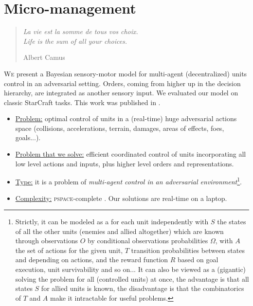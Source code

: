 \chapter{Micro-management}
\begin{quotation}
\noindent
\textit{La vie est la somme de tous vos choix.
\vspace{0.2cm}\\
Life is the sum of all your choices.}
\begin{flushright}Albert Camus\end{flushright}
\end{quotation}

\lettrine{W}{e} present a Bayesian sensory-motor model for multi-agent (decentralized) units control in an adversarial setting. Orders, coming from higher up in the decision hierarchy, are integrated as another sensory input. We evaluated our model on classic StarCraft  tasks. This work was published in \citep{SYNNAEVE:Micro}.

\chaptertoc
{}

\begin{itemize}
\item \underline{Problem:} optimal control of units in a (real-time) huge adversarial actions space (collisions, accelerations, terrain, damages, areas of effects, foes, goals...).
\item \underline{Problem that we solve:} efficient coordinated control of units incorporating all low level actions and inputs, plus higher level orders and representations.
\item \underline{Type:} it is a problem of \textit{multi-agent control in an adversarial environment}\footnote{Strictly, it can be modeled as a  for each unit independently with $S$ the states of all the other units (enemies and allied altogether) which are known through observations $O$ by conditional observations probabilities $\Omega$, with $A$ the set of actions for the given unit, $T$ transition probabilities between states and depending on actions, and the reward function $R$ based on goal execution, unit survivability and so on... It can also be viewed as a (gigantic)  solving the problem for all (controlled units) at once, the advantage is that all states $S$ for allied units is known, the disadvantage is that the combinatorics of $T$ and $A$ make it intractable for useful problems.}.
\item \underline{Complexity:} \textsc{pspace}-complete \citep{Papadimitriou87,GamingComplexity}. Our solutions are real-time on a laptop.
\end{itemize}

